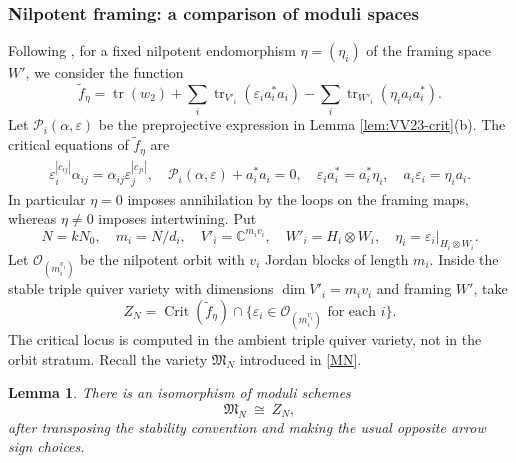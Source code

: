 \documentclass[11pt,reqno]{amsart}
\newtheorem{Lemma}[Theorem]{Lemma}
\theoremstyle{definition}
\theoremstyle{remark}
\def\bbC{\mathbb C}
\begin{document}
\subsubsection{Nilpotent framing: a comparison of moduli spaces}
Following \cite{VV23},
for a fixed nilpotent endomorphism $\eta=(\eta_i)$ of the framing space $W'$, we consider the function
\begin{equation}\label{eq:VV23-deformed-potential}
\tilde f_\eta=\operatorname{tr}(w_2)
       +\sum_i\operatorname{tr}_{V'_i}(\varepsilon_i a_i^*a_i)
       -\sum_i\operatorname{tr}_{W'_i}(\eta_i a_i a_i^*).
\end{equation}
Let $\mathcal P_i(\alpha,\varepsilon)$ be the
preprojective expression in Lemma \ref{lem:VV23-crit}(b).
The critical equations of $\tilde f_\eta$ are
\begin{align}
 \varepsilon_i^{|c_{ij}|}\alpha_{ij}
     =\alpha_{ij}\varepsilon_j^{|c_{ji}|},\quad
 \mathcal P_i(\alpha,\varepsilon)+a_i^*a_i=0,\quad
 \varepsilon_i a_i^*=a_i^*\eta_i,
 \quad a_i\varepsilon_i=\eta_i a_i.
 \label{eq:VV23-deformed-critical}
\end{align}
In particular $\eta=0$ imposes annihilation
by the loops on the framing maps, whereas $\eta\neq 0$ imposes intertwining. 
Put
$$N=kN_0
,\quad
m_i=N/d_i
,\quad
V'_i=\bbC^{m_i v_i}
,\quad 
W'_i=H_i\otimes W_i
,\quad
\eta_i=\varepsilon_i|_{H_i\otimes W_i}.$$
Let $\mathcal O_{(m_i^{v_i})}$ be the nilpotent orbit with $v_i$
Jordan blocks of length $m_i$. Inside the stable triple quiver
variety with dimensions $\dim V'_i=m_i v_i$ and framing $W'$, take
\[
 Z_N=\operatorname{Crit}(\tilde f_\eta)
           \cap\{\varepsilon_i\in\mathcal O_{(m_i^{v_i})}
                        \text{ for each }i\}.
\]
The critical locus is computed in the ambient triple quiver variety, not in the orbit stratum.
Recall the variety $\mathfrak M_N$ introduced in \eqref{MN}.

\begin{Lemma}
There is an isomorphism of moduli schemes
\begin{equation}\label{eq:VV23-Jordan-stratum}
 \mathfrak M_N\ \cong\ Z_N,
\end{equation}
after transposing the stability convention and making the usual
opposite arrow sign choices. 
\end{Lemma}
\end{document}
